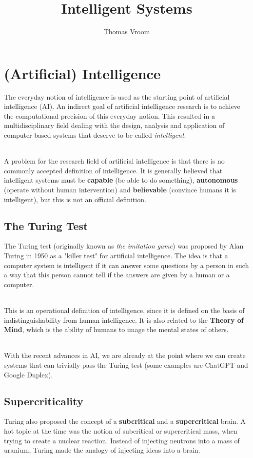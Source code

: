 \documentclass[12pt]{article}
\title{Intelligent Systems}
\author{Thomas Vroom}
\begin{document}
\maketitle

%
%
\section{(Artificial) Intelligence}
The everyday notion of intelligence is used as the starting point of artificial intelligence (AI).
An indirect goal of artificial intelligence research is to achieve the computational precision of this everyday notion.
This resulted in a multidisciplinary field dealing with the design, analysis and application of computer-based systems that deserve to be called \textit{intelligent}.

\noindent
\\
A problem for the research field of artificial intelligence is that there is no commonly accepted definition of intelligence.
It is generally believed that intelligent systems must be \textbf{capable} (be able to do something), \textbf{autonomous} (operate without human intervention) and \textbf{believable} (convince humans it is intelligent), but this is not an official definition.

\subsection{The Turing Test}
The Turing test (originally known as \textit{the imitation game}) was proposed by Alan Turing in 1950 as a "killer test" for artificial intelligence.
The idea is that a computer system is intelligent if it can answer some questions by a person in such a way that this person cannot tell if the answers are given by a human or a computer.

\noindent
\\
This is an operational definition of intelligence, since it is defined on the basis of indistinguishability from human intelligence.
It is also related to the \textbf{Theory of Mind}, which is the ability of humans to image the mental states of others.

\noindent
\\
With the recent advances in AI, we are already at the point where we can create systems that can trivially pass the Turing test (some examples are ChatGPT and Google Duplex).

\subsection{Supercriticality}
Turing also proposed the concept of a \textbf{subcritical} and a \textbf{supercritical} brain.
A hot topic at the time was the notion of subcritical or supercritical mass, when trying to create a nuclear reaction.
Instead of injecting neutrons into a mass of uranium, Turing made the analogy of injecting ideas into a brain.
\end{document}

